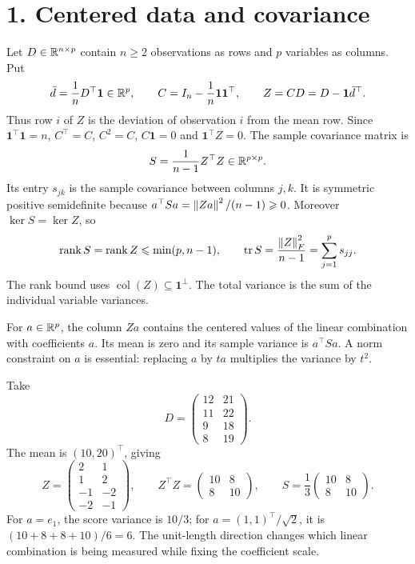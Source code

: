 \section*{1. Centered data and covariance}
Let $D\in\mathbb R^{n\times p}$ contain $n\geqslant2$ observations as rows and
$p$ variables as columns. Put
\[
\bar d=\frac1nD^\top\mathbf1\in\mathbb R^p,\qquad
C=I_n-\frac1n\mathbf1\mathbf1^\top,\qquad
Z=CD=D-\mathbf1\bar d^\top.
\]
Thus row $i$ of $Z$ is the deviation of observation $i$ from the mean
row. Since $\mathbf1^\top\mathbf1=n$,
$C^\top=C$, $C^2=C$, $C\mathbf1=0$ and $\mathbf1^\top Z=0$.
The sample covariance matrix is
\[
S=\frac1{n-1}Z^\top Z\in\mathbb R^{p\times p}.
\]
Its entry $s_{jk}$ is the sample covariance between columns $j,k$.
It is symmetric positive semidefinite because
$a^\top Sa=\left\lVert Za\right\rVert^2/(n-1)\geqslant0$.
Moreover $\ker S=\ker Z$, so
\[
\operatorname{rank}S=\operatorname{rank}Z\leqslant\min(p,n-1),\qquad
\operatorname{tr} S=\frac{\left\lVert Z\right\rVert_F^2}{n-1}=\sum_{j=1}^p s_{jj}.
\]
The rank bound uses $\operatorname{col}(Z)\subseteq\mathbf1^\perp$.
The total variance is the sum of the individual variable variances.

For $a\in\mathbb R^p$, the column $Za$ contains the centered values of the
linear combination with coefficients $a$. Its mean is zero and its
sample variance is $a^\top Sa$. A norm constraint on $a$ is essential:
replacing $a$ by $ta$ multiplies the variance by $t^2$.

\begin{example}\label{eg:12:data}
Take
\[
D=\begin{pmatrix}12&21\\11&22\\9&18\\8&19\end{pmatrix}.
\]
The mean is $(10,20)^\top$, giving
\[
Z=\begin{pmatrix}2&1\\1&2\\-1&-2\\-2&-1\end{pmatrix},\qquad
Z^\top Z=\begin{pmatrix}10&8\\8&10\end{pmatrix},\qquad
S=\frac13\begin{pmatrix}10&8\\8&10\end{pmatrix}.
\]
For $a=e_1$, the score variance is $10/3$; for
$a=(1,1)^\top/\sqrt2$, it is $(10+8+8+10)/6=6$.
The unit-length direction changes which linear combination is being
measured while fixing the coefficient scale.
\end{example}

